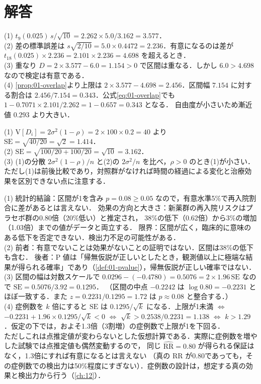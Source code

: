 \documentclass[a4paper,11pt,openany]{ltjsbook}
\newenvironment{kaitou}[1]{%
  \par\medskip\noindent
  \begin{tcolorbox}[enhanced,breakable,colback=bkgray!3,colframe=bkgray!60,boxrule=0.4pt,
    left=4pt,right=4pt,top=2pt,bottom=2pt,arc=1pt,
    title={\cref{#1}の解答},fonttitle=\bfseries\small,coltitle=white,colbacktitle=bkgray!80]}%
  {\end{tcolorbox}\par}
\newcommand{\V}{\mathrm{V}}
\newcommand{\SE}{\mathrm{SE}}
\newcommand{\RR}{\mathrm{RR}}
\begin{document}
\section{解答}\label{sec:01-sol}
\enlargethispage{1\baselineskip}
\begin{kaitou}{reidai:01-1}
(1) $t_9(0.025)\,s/\sqrt{10}=2.262\times5.0/3.162=3.577$．\\
(2) 差の標準誤差は $s\sqrt{2/10}=5.0\times0.4472=2.236$．有意になるのは差が $t_{18}(0.025)\times2.236=2.101\times2.236=4.698$ を超えるとき．\\
(3) 重なり $D=2\times3.577-6.0=1.154>0$ で区間は重なる．しかし $6.0>4.698$ なので検定は有意である．\\
(4) \cref{prop:01-overlap}より上限は $2\times3.577-4.698=2.456$．区間幅 $7.154$ に対する割合は
$2.456/7.154=0.343$．公式\cref{eq:01-overlap}でも $1-0.7071\times2.101/2.262=1-0.657=0.343$ となる．
自由度が小さいため漸近値 $0.293$ より大きい．
\end{kaitou}

\begin{kaitou}{reidai:01-2}
(1) $\V[D_i]=2\sigma^2(1-\rho)=2\times100\times0.2=40$ より $\SE=\sqrt{40/20}=\sqrt2=1.414$．\\
(2) $\SE=\sqrt{100/20+100/20}=\sqrt{10}=3.162$．\\
(3) (1)の分散 $2\sigma^2(1-\rho)/n$ と(2)の $2\sigma^2/n$ を比べ，$\rho>0$ のとき(1)が小さい．
ただし(1)は前後比較であり，対照群がなければ時間の経過による変化と治療効果を区別できない点に注意する．
\end{kaitou}

\begin{kaitou}{reidai:01-3}
(1) 統計的結論：区間が1を含み $p=0.08\ge0.05$ なので，有意水準5\%で再入院割合に差があるとは言えない．
効果の方向と大きさ：新薬群の再入院リスクはプラセボ群の0.80倍（20\%低い）と推定され，
38\%の低下（0.62倍）から3\%の増加（1.03倍）までの値がデータと両立する．
限界：区間が広く，臨床的に意味のある低下を否定できない．検出力不足の可能性がある．\\
(2) 前者：有意でないことは効果がないことの証明ではない．区間は38\%の低下も含む．
後者：P 値は「帰無仮説が正しいとしたとき，観測値以上に極端な結果が得られる確率」であり（\cref{def:01-pvalue}），帰無仮説が正しい確率ではない．\\
(3) 区間の幅は対数スケールで $0.0296-(-0.4780)=0.5076=2\times1.96\,\SE$ なので $\SE=0.5076/3.92=0.1295$．
（区間の中点 $-0.2242$ は $\log0.80=-0.2231$ とほぼ一致する．また $z=0.2231/0.1295=1.72$ は $p\approx0.08$ と整合する．）\\
(4) 症例数を $k$ 倍にすると $\SE$ は $0.1295/\sqrt k$ になる．上限が1未満 $\iff$ $-0.2231+1.96\times0.1295/\sqrt k<0$
$\iff$ $\sqrt k>0.2538/0.2231=1.138$ $\iff$ $k>1.29$．仮定の下では，およそ1.3倍（3割増）の症例数で上限が1を下回る．\\
ただしこれは点推定値が変わらないとした仮想計算である．実際に症例数を増やした試験では点推定値も偶然変動するので，
同じ $\widehat{\RR}=0.80$ が得られる保証はなく，1.3倍にすれば有意になるとは言えない
（真の RR が0.80であっても，その症例数での検出力は50\%程度にすぎない）．症例数の設計は，想定する真の効果と検出力から行う（\cref{ch:12}）．
\end{kaitou}
\end{document}
